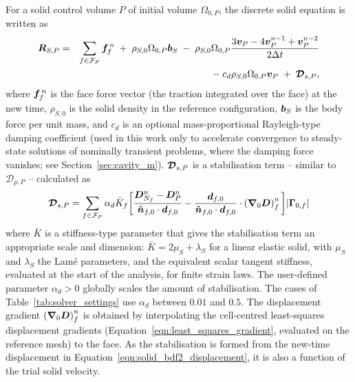 For a solid control volume $P$ of initial volume $\Omega_{0,P}$, the discrete solid equation is written as
\begin{eqnarray}
    \boldsymbol{R}_{S,P}
    &=&
    \sum_{f \in \mathcal{F}_P}
    \boldsymbol{f}^{\,n}_f
    \;+\;  \rho_{S,0} \Omega_{0,P}   \boldsymbol{b}_S
    \;-\;
    \rho_{S,0} \Omega_{0,P}
        \frac{
    3\boldsymbol{v}_P
    -
    4\boldsymbol{v}^{n-1}_P
    +
    \boldsymbol{v}^{n-2}_P
    }
    {2\Delta t} \notag \\
    &&
    - \;
    c_d \rho_{S,0} \Omega_{0,P} \boldsymbol{v}_{P}
        \;+\;
    \boldsymbol{\mathcal{D}}_{s,P},
    \label{eqn:solid_velocity_residual}
\end{eqnarray}
where $\boldsymbol{f}^{\,n}_f$ is the face force vector (the traction integrated over the face) at the new time, $\rho_{S,0}$ is the solid density in the reference configuration, $\boldsymbol{b}_S$ is the body force per unit mass,
and $c_d$ is an optional mass-proportional Rayleigh-type damping coefficient (used in this work only to accelerate convergence to steady-state solutions of nominally transient problems, where the damping force vanishes; see Section~\ref{sec:cavity_m}).
$\boldsymbol{\mathcal{D}}_{s,P}$ is a stabilisation term -- similar to $\mathcal{D}_{p,P}$ -- calculated as
\begin{eqnarray} \label{eqn:rhie_chow_s}
	\boldsymbol{\mathcal{D}}_{s,P}
	=
	\sum_{f \in \mathcal{F}_P}
	\alpha_d \bar{K}_f
        \bigg[
	\frac{\boldsymbol{D}^{n}_{N_f} - \boldsymbol{D}^{n}_{P}}{\boldsymbol{\hat{n}}_{f,0} \cdot \boldsymbol{d}_{f,0}}
       -
       \frac{\boldsymbol{d}_{f,0}}{\boldsymbol{\hat{n}}_{f,0} \cdot \boldsymbol{d}_{f,0}} \cdot \left( \boldsymbol{\nabla}_0 \boldsymbol{D} \right)^{n}_f
    \bigg]
    |\boldsymbol{\Gamma}_{0,f}|
\end{eqnarray}
where $\bar{K}$ is a stiffness-type parameter that gives the stabilisation term an appropriate scale and dimension: $\bar{K} = 2\mu_S + \lambda_S$ for a linear elastic solid, with $\mu_S$ and $\lambda_S$ the Lam\'e parameters, and the equivalent scalar tangent stiffness, evaluated at the start of the analysis, for finite strain laws.
The user-defined parameter $\alpha_d > 0$ globally scales the amount of stabilisation.
The cases of Table~\ref{tab:solver_settings} use $\alpha_d$ between $0.01$ and $0.5$.
The displacement gradient $\left( \boldsymbol{\nabla}_0 \boldsymbol{D} \right)^{n}_f$ is obtained by interpolating the cell-centred least-squares displacement gradients (Equation~\eqref{eqn:least_squares_gradient}, evaluated on the reference mesh) to the face.
As the stabilisation is formed from the new-time displacement in Equation~\eqref{eqn:solid_bdf2_displacement}, it is also a function of the trial solid velocity.

